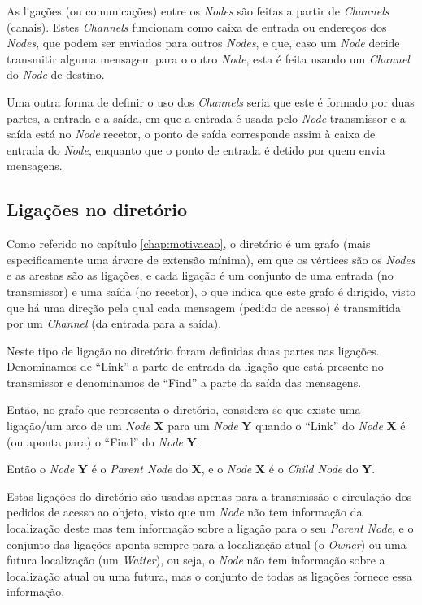 As ligações (ou comunicações) entre os \emph{Nodes} são feitas a partir de \emph{Channels} (canais). Estes \emph{Channels} funcionam como caixa de entrada ou endereços dos \emph{Nodes}, que podem ser enviados para outros \emph{Nodes}, e que, caso um \emph{Node} decide transmitir alguma mensagem para o outro \emph{Node}, esta é feita usando um \emph{Channel} do \emph{Node} de destino.

Uma outra forma de definir o uso dos \emph{Channels} seria que este é formado por duas partes, a entrada e a saída, em que a entrada é usada pelo \emph{Node} transmissor e a saída está no \emph{Node} recetor, o ponto de saída corresponde assim à caixa de entrada do \emph{Node}, enquanto que o ponto de entrada é detido por quem envia mensagens.

\subsection*{Ligações no diretório}

Como referido no capítulo \ref{chap:motivacao}, o diretório é um grafo (mais especificamente uma árvore de extensão mínima), em que os vértices são os \emph{Nodes} e as arestas são as ligações, e cada ligação é um conjunto de uma entrada (no transmissor) e uma saída (no recetor), o que indica que este grafo é dirigido, visto que há uma direção pela qual cada mensagem (pedido de acesso) é transmitida por um \emph{Channel} (da entrada para a saída).

Neste tipo de ligação no diretório foram definidas duas partes nas ligações. Denominamos de  ``Link'' a parte de entrada da ligação que está presente no transmissor e denominamos de ``Find'' a parte da saída das mensagens.

Então, no grafo que representa o diretório, considera-se que existe uma ligação/um arco de um \emph{Node} \textbf{X} para um \emph{Node} \textbf{Y} quando o ``Link'' do 
\emph{Node} \textbf{X}  é (ou aponta para) o ``Find'' do \emph{Node} \textbf{Y}.

Então o \emph{Node} \textbf{Y} é o \emph{Parent Node} do \textbf{X}, e o \emph{Node} \textbf{X} é o \emph{Child Node} do \textbf{Y}.

Estas ligações do diretório são usadas apenas para a transmissão e circulação dos pedidos de acesso ao objeto, visto que um \emph{Node} não tem informação da localização deste mas tem informação sobre a ligação para o seu \emph{Parent Node},
e o conjunto das ligações aponta sempre para a localização atual (o \emph{Owner}) ou uma futura localização (um \emph{Waiter}), ou seja, o \emph{Node} não tem informação sobre a localização atual ou uma futura, mas o conjunto de todas as ligações fornece essa informação.


